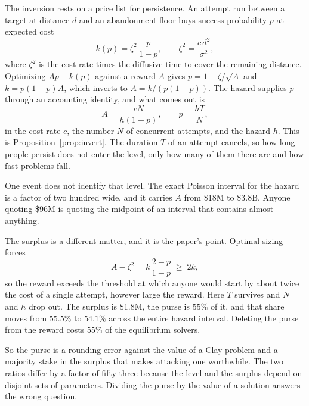 \documentclass[11pt]{article}
\theoremstyle{itheads}
\begin{document}
The inversion rests on a price list for persistence. An attempt run between
a target at distance $d$ and an abandonment floor buys success probability
$p$ at expected cost
\begin{equation}
k(p)=\zeta^{2}\,\frac{p}{1-p},
\qquad
\zeta^{2}=\frac{c\,d^{2}}{\sigma^{2}},
\label{eq:intro-price}
\end{equation}
where $\zeta^{2}$ is the cost rate times the diffusive time to cover the
remaining distance. Optimizing $Ap-k(p)$ against a reward $A$ gives
$p=1-\zeta/\sqrt A$ and $k=p(1-p)A$, which inverts to $A=k/(p(1-p))$. The
hazard supplies $p$ through an accounting identity, and what comes out is
\begin{equation}
A=\frac{cN}{h(1-p)},
\qquad
p=\frac{hT}{N},
\end{equation}
in the cost rate $c$, the number $N$ of concurrent attempts, and the hazard
$h$. This is Proposition~\ref{prop:invert}. The duration $T$ of an attempt
cancels, so how long people persist does not enter the level, only how many
of them there are and how fast problems fall.

One event does not identify that level. The exact Poisson interval for the
hazard is a factor of two hundred wide, and it carries $A$ from \$18M to
\$3.8B. Anyone quoting \$96M is quoting the midpoint of an interval that
contains almost anything.

The surplus is a different matter, and it is the paper's point. Optimal
sizing forces
\begin{equation}
A-\zeta^{2}=k\,\frac{2-p}{1-p}\;\ge\;2k,
\label{eq:intro-surplus}
\end{equation}
so the reward exceeds the threshold at which anyone would start by about
twice the cost of a single attempt, however large the reward. Here $T$
survives and $N$ and $h$ drop out. The surplus is \$1.8M, the purse is
$55\%$ of it, and that share moves from $55.5\%$ to $54.1\%$ across the
entire hazard interval. Deleting the purse from the reward costs $55\%$ of
the equilibrium solvers.

So the purse is a rounding error against the value of a Clay problem and a
majority stake in the surplus that makes attacking one worthwhile. The two
ratios differ by a factor of fifty-three because the level and the surplus
depend on disjoint sets of parameters. Dividing the purse by the value of a
solution answers the wrong question.
\end{document}
